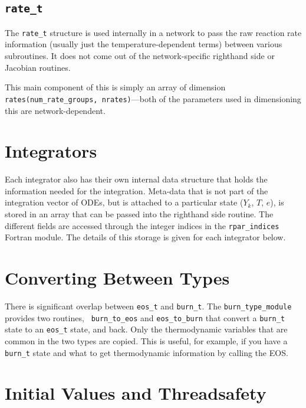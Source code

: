 \subsection{{\tt rate\_t}}

The {\tt rate\_t} structure is used internally in a network to pass
the raw reaction rate information (usually just the
temperature-dependent terms) between various subroutines.  It does not
come out of the network-specific righthand side or Jacobian routines.

This main component of this is simply an array of dimension {\tt
  rates(num\_rate\_groups, nrates)}---both of the parameters
used in dimensioning this are network-dependent.


\section{Integrators}

Each integrator also has their own internal data structure that holds
the information needed for the integration.  Meta-data that is not
part of the integration vector of ODEs, but is attached to a
particular state ($Y_k$, $T$, $e$), is stored in an array that can be
passed into the righthand side routine.  The different fields are
accessed through the integer indices in the {\tt rpar\_indices}
Fortran module.  The details of this storage is given for each
integrator below.


\section{Converting Between Types}

There is significant overlap between {\tt eos\_t} and {\tt burn\_t}.
The {\tt burn\_type\_module} provides two routines, {\tt
  burn\_to\_eos} and {\tt eos\_to\_burn} that convert a {\tt burn\_t}
state to an {\tt eos\_t} state, and back.  Only the thermodynamic
variables that are common in the two types are copied.  This is
useful, for example, if you have a {\tt burn\_t} state and what to get
thermodynamic information by calling the EOS.


\section{Initial Values and Threadsafety}

